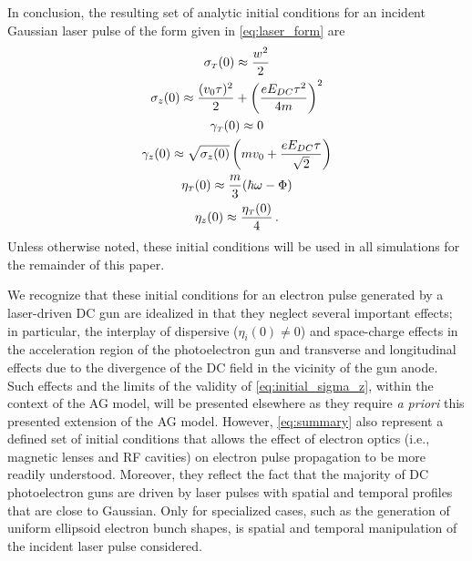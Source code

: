 In conclusion, the resulting set of analytic initial conditions for an incident Gaussian laser pulse of the form given in \ref{eq:laser_form} are
\begin{subequations} \label{eq:summary}
  \begin{gather}
    \sigma_{ {\scriptscriptstyle T} } ( 0 ) \approx \frac{ w^{ 2 } }{ 2 } \\
    \sigma_{ z } ( 0 ) \approx \frac{ ( v_{ 0 } \tau )^{ 2 } }{ 2 } + \left ( \frac{ e E_{ DC } \tau^{ 2 } }{ 4 m } \right )^{ 2 } \\
    \gamma_{ {\scriptscriptstyle T} } ( 0 ) \approx 0 \\
    \gamma_{ z } ( 0 ) \approx \sqrt{ \sigma_{ z } ( 0 ) } \left ( m v_{ 0 } + \frac{ e E_{DC} \tau }{ \sqrt{ 2 } } \right ) \\
    \eta_{ {\scriptscriptstyle T} } ( 0 ) \approx \frac{ m }{ 3 } ( \hbar \omega - \Phi ) \\
    \eta_{ z } ( 0 ) \approx \frac{ \eta_{ {\scriptscriptstyle T} } ( 0 ) }{ 4 } \, \text{.}
  \end{gather}
\end{subequations}
Unless otherwise noted, these initial conditions will be used in all simulations for the remainder of this paper.

We recognize that these initial conditions for an electron pulse generated by a laser-driven DC gun are idealized in that they neglect several important effects; in particular, the interplay of dispersive ($ \eta_{i}(0) \neq 0 $) and space-charge effects in the acceleration region of the photoelectron gun and transverse and longitudinal effects due to the divergence of the DC field in the vicinity of the gun anode.\cite{berger_dc_2009,togawa_ceb6_2007}
Such effects and the limits of the validity of \ref{eq:initial_sigma_z}, within the context of the AG model, will be presented elsewhere as they require \textit{a priori} this presented extension of the AG model.
However, \ref{eq:summary} also represent a defined set of initial conditions that allows the effect of electron optics (i.e., magnetic lenses and RF cavities) on electron pulse propagation to be more readily understood.
Moreover, they reflect the fact that the majority of DC photoelectron guns are driven by laser pulses with spatial and temporal profiles that are close to Gaussian.\cite{williamson_clocking_1997,sciaini_electronic_2009}
Only for specialized cases, such as the generation of uniform ellipsoid electron bunch shapes, is spatial and temporal manipulation of the incident laser pulse considered.\cite{luiten_how_2004,li_generating_2008}


